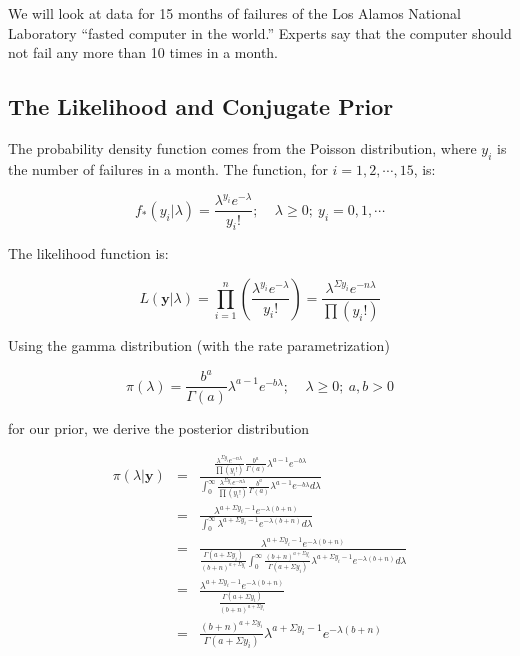 \documentclass[12pt]{article}
\begin{document}
\noindent We will look at data for 15 months of failures of the Los Alamos National Laboratory ``fasted computer in the world.''  Experts say that the computer should not fail any more than 10 times in a month.

\subsection{The Likelihood and Conjugate Prior}

The probability density function comes from the Poisson distribution, where $y_i$ is the number of failures in a month.  The function, for $i=1,2,\cdots,15$, is:

\[f_*(y_i|\lambda)=\frac{\lambda^{y_i}e^{-\lambda}}{y_i!};\ \ \ \ \ \lambda\geq 0;\ y_i=0,1,\cdots \]

\noindent The likelihood function is:

\[L(\mathbf{y}|\lambda) = \prod_{i=1}^n\left(\frac{\lambda^{y_i}e^{-\lambda}}{y_i!}\right) = \frac{\lambda^{\Sigma y_i}e^{-n\lambda}}{\prod (y_i!)}\]



\noindent Using the gamma distribution (with the rate parametrization)

\[\pi(\lambda)=\frac{b^a}{\Gamma(a)}\lambda^{a-1}e^{-b\lambda};\ \ \ \ \ \lambda\geq 0;\ a,b>0\]

\noindent for our prior, we derive the posterior distribution

\begin{eqnarray*}
\pi(\lambda|\mathbf{y}) &=& \frac{\frac{\lambda^{\Sigma y_i}e^{-n\lambda}}{\prod (y_i!)}\frac{b^a}{\Gamma(a)}\lambda^{a-1}e^{-b\lambda}}{\int_0^\infty\frac{\lambda^{\Sigma y_i}e^{-n\lambda}}{\prod (y_i!)}\frac{b^a}{\Gamma(a)}\lambda^{a-1}e^{-b\lambda}d\lambda} \\
&=& \frac{\lambda^{a+\Sigma y_i-1}e^{-\lambda(b+n)}}{\int_0^\infty\lambda^{a+\Sigma y_i-1}e^{-\lambda(b+n)}d\lambda} \\
&=& \frac{\lambda^{a+\Sigma y_i-1}e^{-\lambda(b+n)}}{\frac{\Gamma(a+\Sigma y_i)}{(b+n)^{a+\Sigma y_i}}\int_0^\infty\frac{(b+n)^{a+\Sigma y_i}}{\Gamma(a+\Sigma y_i)}\lambda^{a+\Sigma y_i-1}e^{-\lambda(b+n)}d\lambda} \\
&=& \frac{\lambda^{a+\Sigma y_i-1}e^{-\lambda(b+n)}}{\frac{\Gamma(a+\Sigma y_i)}{(b+n)^{a+\Sigma y_i}}} \\
&=& \frac{(b+n)^{a+\Sigma y_i}}{\Gamma(a+\Sigma y_i)}\lambda^{a+\Sigma y_i-1}e^{-\lambda(b+n)} \\
\end{eqnarray*}
\end{document}
